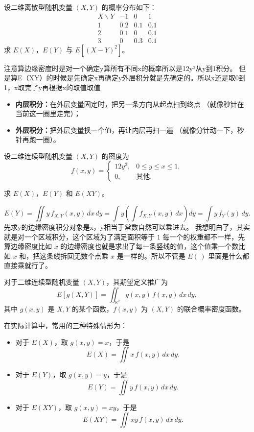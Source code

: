 \begin{homework}[3.19]
设二维离散型随机变量 $(X,Y)$ 的概率分布如下：
\[
\begin{array}{c|ccc}
  X\backslash Y & -1 & 0 & 1\\ \hline
  1 & 0.2 & 0.1 & 0.1\\
  2 & 0.1 & 0 & 0.1\\
  3 & 0 & 0.3 & 0.1
\end{array}
\]
求 $E(X)$，$E(Y)$ 与 $E[(X-Y)^2]$。
\end{homework}
\begin{dxtips}
    注意算边缘密度时是对一个确定y算所有不同x的概率所以是12y²从y到1积分。
    但是算E（XY）的时候是先确定x再确定y外层积分就是先确定的。所以x还是取0到1，x取完了y再根据x的取值取值
    \begin{itemize}
  \item \textbf{内层积分：}在外层变量固定时，把另一条方向从起点扫到终点
  （就像秒针在当前这一圈里走完）；
  \item \textbf{外层积分：}把外层变量换一个值，再让内层再扫一遍
  （就像分针动一下，秒针再跑一圈）。
\end{itemize}
\end{dxtips}
\begin{homework}[3.20]
设二维连续型随机变量 $(X,Y)$ 的密度为
\[
f(x,y)=
\begin{cases}
12y^2,& 0\le y\le x\le1,\\[4pt]
0,&\text{其他}.
\end{cases}
\]

求 $E(X)$，$E(Y)$ 和 $E(XY)$。
\end{homework}
\begin{dxtips}
    \[
E(Y)
=\iint y\,f_{X,Y}(x,y)\,dx\,dy
=\int y\left(\int f_{X,Y}(x,y)\,dx\right)dy
=\int y\,f_Y(y)\,dy.
\]
先求y的边缘密度积分对象是x，y相当于常数自然可以乘进去。
我想明白了，其实就是对一个区域积分，这个区域为了满足面积等于 $1$ 每一个的权重都不一样，先算边缘密度比如 $x$ 的边缘密度也就是求出了每一条竖线的值，这个值乘一个数比如 $x$ 和，把这条线拆回无数个点乘 $x$ 是一样的。所以不管是 $E(\,)$ 里面是什么都直接乘就行了。
\end{dxtips}
\begin{note}[二维随机变量的期望及常用情形]
对于二维连续型随机变量 $(X,Y)$，其期望定义推广为
\[
E[g(X,Y)]
=\iint_{\mathbb R^2} g(x,y)\,f(x,y)\,dx\,dy,
\]
其中 $g(x,y)$ 是 $X,Y$ 的某个函数，$f(x,y)$ 为 $(X,Y)$ 的联合概率密度函数。

\vspace{0.5em}
在实际计算中，常用的三种特殊情形为：
\begin{itemize}
  \item 对于 $E(X)$，取 $g(x,y)=x$，于是
  \[
  E(X)=\iint x\,f(x,y)\,dx\,dy.
  \]

  \item 对于 $E(Y)$，取 $g(x,y)=y$，于是
  \[
  E(Y)=\iint y\,f(x,y)\,dx\,dy.
  \]

  \item 对于 $E(XY)$，取 $g(x,y)=xy$，于是
  \[
  E(XY)=\iint xy\,f(x,y)\,dx\,dy.
  \]
\end{itemize}
\end{note}
